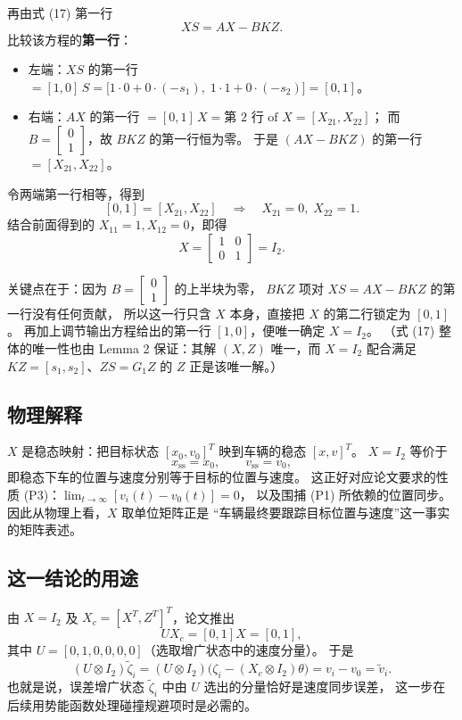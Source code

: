 再由式 (17) 第一行
\[
XS = AX - BKZ.
\]
比较该方程的\textbf{第一行}：
\begin{itemize}
  \item 左端：$XS$ 的第一行 $= [1,0]\,S
    = \bigl[1\cdot 0 + 0\cdot(-s_1),\; 1\cdot 1 + 0\cdot(-s_2)\bigr] = [0,1]$。
  \item 右端：$AX$ 的第一行 $= [0,1]\,X = \text{第 2 行 of }X = [X_{21}, X_{22}]$；
    而 $B=[\begin{smallmatrix}0\\1\end{smallmatrix}]$，故 $BKZ$ 的第一行恒为零。
    于是 $(AX-BKZ)$ 的第一行 $= [X_{21}, X_{22}]$。
\end{itemize}
令两端第一行相等，得到
\[
[0,1] = [X_{21}, X_{22}] \quad\Longrightarrow\quad X_{21}=0,\; X_{22}=1.
\]
结合前面得到的 $X_{11}=1, X_{12}=0$，即得
\[
X = \begin{bmatrix}1&0\\0&1\end{bmatrix} = I_2.
\]

关键点在于：因为 $B=[\begin{smallmatrix}0\\1\end{smallmatrix}]$ 的上半块为零，
$BKZ$ 项对 $XS=AX-BKZ$ 的第一行没有任何贡献，
所以这一行只含 $X$ 本身，直接把 $X$ 的第二行锁定为 $[0,1]$。
再加上调节输出方程给出的第一行 $[1,0]$，便唯一确定 $X=I_2$。
（式 (17) 整体的唯一性也由 Lemma 2 保证：其解 $(X,Z)$ 唯一，而 $X=I_2$ 配合满足
$KZ=[s_1,s_2]$、$ZS=G_1Z$ 的 $Z$ 正是该唯一解。）

\subsection{物理解释}

$X$ 是稳态映射：把目标状态 $[x_0, v_0]^T$ 映到车辆的稳态 $[x, v]^T$。
$X=I_2$ 等价于
\[
x_{\mathrm{ss}} = x_0,\qquad v_{\mathrm{ss}} = v_0,
\]
即稳态下车的位置与速度分别等于目标的位置与速度。
这正好对应论文要求的性质 (P3)：$\lim_{t\to\infty}[v_i(t)-v_0(t)]=0$，
以及围捕 (P1) 所依赖的位置同步。因此从物理上看，$X$ 取单位矩阵正是
“车辆最终要跟踪目标位置与速度”这一事实的矩阵表述。

\subsection{这一结论的用途}

由 $X=I_2$ 及 $X_c=[X^T, Z^T]^T$，论文推出
\[
UX_c = [0,1]X = [0,1],
\]
其中 $U=[0,1,0,0,0,0]$（选取增广状态中的速度分量）。
于是
\[
(U\otimes I_2)\tilde\zeta_i
= (U\otimes I_2)\bigl(\zeta_i - (X_c\otimes I_2)\theta\bigr)
= v_i - v_0 = \tilde v_i.
\]
也就是说，误差增广状态 $\tilde\zeta_i$ 中由 $U$ 选出的分量恰好是速度同步误差，
这一步在后续用势能函数处理碰撞规避项时是必需的。

